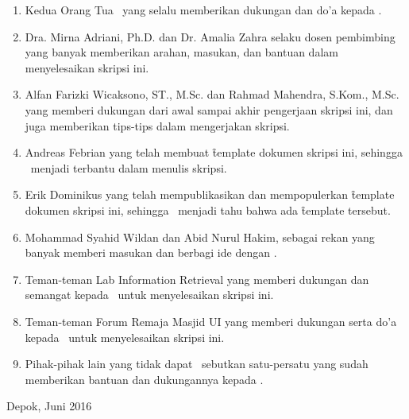 \begin{enumerate}
	\item Kedua Orang Tua \saya~yang selalu memberikan dukungan dan do'a kepada \saya.
	\item Dra. Mirna Adriani, Ph.D. dan Dr. Amalia Zahra selaku dosen pembimbing yang banyak memberikan arahan, masukan, dan bantuan dalam menyelesaikan skripsi ini.
  \item Alfan Farizki Wicaksono, ST., M.Sc. dan Rahmad Mahendra, S.Kom., M.Sc. yang memberi dukungan dari awal sampai akhir pengerjaan skripsi ini, dan juga memberikan tips-tips dalam mengerjakan skripsi.
  \item Andreas Febrian yang telah membuat \f{template} dokumen skripsi ini, sehingga \saya~menjadi terbantu dalam menulis skripsi.
  \item Erik Dominikus yang telah mempublikasikan dan mempopulerkan \f{template} dokumen skripsi ini, sehingga \saya~menjadi tahu bahwa ada \f{template} tersebut.
	\item Mohammad Syahid Wildan dan Abid Nurul Hakim, sebagai rekan yang banyak memberi masukan dan berbagi ide dengan \saya.
  \item Teman-teman Lab Information Retrieval yang memberi dukungan dan semangat kepada \saya~untuk menyelesaikan skripsi ini.
  \item Teman-teman Forum Remaja Masjid UI yang memberi dukungan serta do'a kepada \saya~untuk menyelesaikan skripsi ini.
	\item Pihak-pihak lain yang tidak dapat \saya~sebutkan satu-persatu yang sudah memberikan bantuan dan dukungannya kepada \saya.
\end{enumerate}
\vspace*{0.1cm}
\begin{flushright}
Depok, Juni 2016\\[0.1cm]
\vspace*{1cm}
\penulis

\end{flushright}